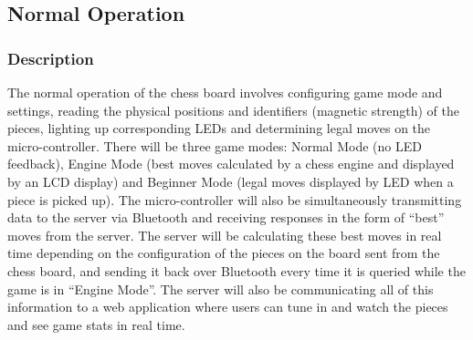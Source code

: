 \documentclass[12pt]{article}
\begin{document}
\subsection{Normal Operation}
\subsubsection{Description}{
    The normal operation of the chess board involves configuring game mode and settings, reading the physical positions and identifiers (magnetic strength) of the pieces, 
    lighting up corresponding LEDs and determining legal moves on the micro-controller. There will be three game modes: Normal Mode (no LED feedback), Engine Mode (best moves 
    calculated by a chess engine and displayed by an LCD display) and Beginner Mode (legal moves displayed by LED when a piece is picked up). The micro-controller will also be 
    simultaneously transmitting data to the server via Bluetooth and receiving responses in the form of ``best'' moves from the server. The server will be calculating these 
    best moves in real time depending on the configuration of the pieces on the board sent from the chess board, and sending it back over Bluetooth every time it is queried
    while the game is in ``Engine Mode''. The server will also be communicating all of this information to a web application where users can tune in and watch the pieces and see
    game stats in real time.
}
\end{document}
